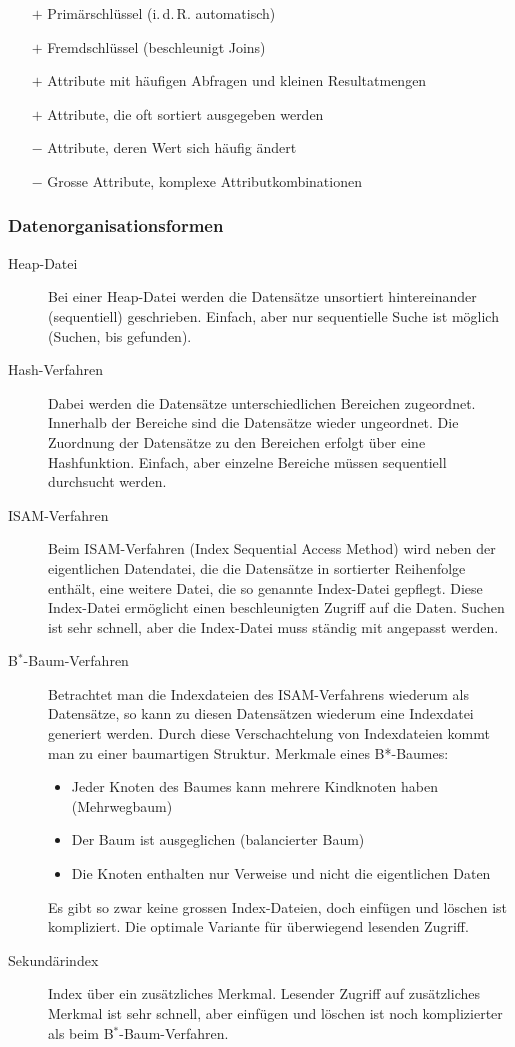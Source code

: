 \begin{itemize}\itemsep0em
	\item [$+$] Primärschlüssel (i.\,d.\,R. automatisch)
	\item [$+$] Fremdschlüssel (beschleunigt Joins)
	\item [$+$] Attribute mit häufigen Abfragen und kleinen Resultatmengen
	\item [$+$] Attribute, die oft sortiert ausgegeben werden
	\item [$-$] Attribute, deren Wert sich häufig ändert
	\item [$-$] Grosse Attribute, komplexe Attributkombinationen
\end{itemize}

\subsubsection{Datenorganisationsformen}
\begin{description}
	\item [Heap-Datei] Bei einer Heap-Datei werden die Datensätze unsortiert hintereinander (sequentiell) geschrieben.
	Einfach, aber nur sequentielle Suche ist möglich (Suchen, bis gefunden).
	\item [Hash-Verfahren] Dabei werden die Datensätze unterschiedlichen Bereichen zugeordnet. Innerhalb der Bereiche 
	sind die Datensätze wieder ungeordnet. Die Zuordnung der Datensätze zu den Bereichen erfolgt über eine Hashfunktion.
	Einfach, aber einzelne Bereiche müssen sequentiell durchsucht werden.
	\item [ISAM-Verfahren] Beim ISAM-Verfahren (Index Sequential Access Method) wird neben der eigentlichen Datendatei, 
	die die Datensätze in sortierter Reihenfolge enthält, eine weitere Datei, die so genannte Index-Datei gepflegt. 
	Diese Index-Datei ermöglicht einen beschleunigten Zugriff auf die Daten. Suchen ist sehr schnell, aber die Index-Datei
	muss ständig mit angepasst werden.
	\item [B$^*$-Baum-Verfahren] Betrachtet man die Indexdateien des ISAM-Verfahrens wiederum als Datensätze, so kann zu diesen Datensätzen wiederum eine Indexdatei
	generiert werden. Durch diese Verschachtelung von Indexdateien kommt man zu einer baumartigen Struktur. 
	Merkmale eines B*-Baumes:
	\begin{itemize}\itemsep0em
		\item Jeder Knoten des Baumes kann mehrere Kindknoten haben (Mehrwegbaum)
		\item Der Baum ist ausgeglichen (balancierter Baum)
		\item Die Knoten enthalten nur Verweise und nicht die eigentlichen Daten
	\end{itemize}
	Es gibt so zwar keine grossen Index-Dateien, doch einfügen und löschen ist kompliziert. Die optimale Variante
	für überwiegend lesenden Zugriff.
	\item [Sekundärindex] Index über ein zusätzliches Merkmal. Lesender Zugriff auf zusätzliches Merkmal ist sehr schnell, aber einfügen und
löschen ist noch komplizierter als beim B$^*$-Baum-Verfahren.
\end{description}

